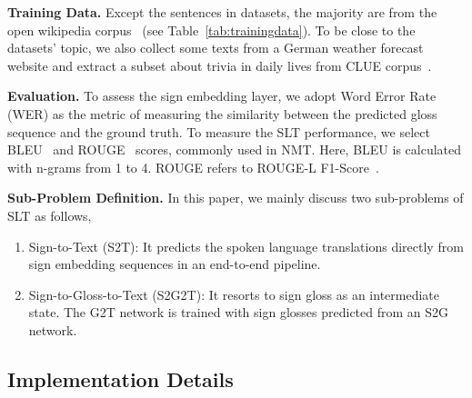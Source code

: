 \documentclass[final]{cvpr}
\begin{document}
\textbf{Training Data.} 
Except the sentences in datasets, 
the majority are from the open wikipedia corpus~\cite{WMT19findings} (see Table~\ref{tab:trainingdata}). 
To be close to the datasets' topic, we also collect some texts from a German weather forecast website and extract a subset about trivia in daily lives from CLUE corpus~\cite{xu-etal-2020-clue}. 

\textbf{Evaluation.}
To assess the sign embedding layer, we adopt Word Error Rate (WER) as the metric of measuring the similarity between the predicted gloss sequence and the ground truth. 
To measure the SLT performance, we select BLEU~\cite{papineni2002bleu} and ROUGE~\cite{lin-2004-rouge} scores, commonly used in NMT. Here, BLEU is calculated with n-grams from 1 to 4. ROUGE refers to ROUGE-L F1-Score~\cite{lin-2004-rouge}.

\textbf{Sub-Problem Definition.} 
In this paper, we mainly discuss two sub-problems of SLT as follows, 
\begin{enumerate}[itemsep=0pt,topsep=2pt,parsep=1pt]
   \item Sign-to-Text (S2T): It predicts the spoken language translations directly from sign embedding sequences in an end-to-end pipeline.  
   \item Sign-to-Gloss-to-Text (S2G2T): 
               It resorts to sign gloss as an intermediate state. 
               The G2T network is trained with sign glosses predicted from an S2G network. 
\end{enumerate}


\subsection{Implementation Details}
\end{document}
